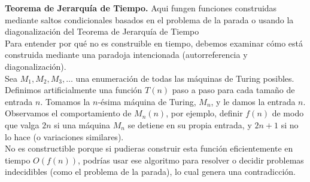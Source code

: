 \begin{itemize}
    

    \textbf{Teorema de Jerarquía de Tiempo.} Aqui fungen funciones construidas mediante saltos condicionales basados en el problema de la parada o usando la diagonalización del Teorema de Jerarquía de Tiempo\\ 
    
    Para entender por qué no es construible en tiempo, debemos examinar cómo está construida mediante una paradoja intencionada (autorreferencia y diagonalización).\\
    
    Sea $M_1, M_2, M_3, \dots$ una enumeración de todas las máquinas de Turing posibles. Definimos artificialmente una función $T(n)$ paso a paso para cada tamaño de entrada $n$. Tomamos la $n$-ésima máquina de Turing, $M_n$, y le damos la entrada $n$.\\
    
    Observamos el comportamiento de $M_n(n)$, por ejemplo, definir \(f(n)\) de modo que valga \(2n\) si una máquina \(M_{n}\) se detiene en su propia entrada, y \(2n + 1\) si no lo hace (o variaciones similares).\\
    
    No es constructible porque si pudieras construir esta función eficientemente en tiempo \(O(f(n))\), podrías usar ese algoritmo para resolver o decidir problemas indecidibles (como el problema de la parada), lo cual genera una contradicción.\cite{mathstackexchange658854}
    
\end{itemize}

